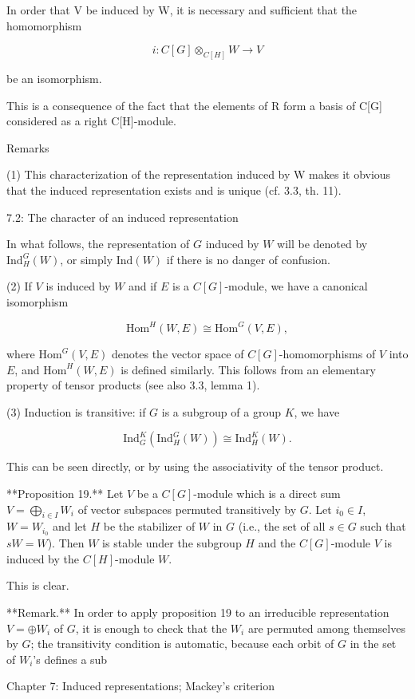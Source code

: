 In order that V be induced by W, it is necessary and sufficient that the homomorphism

$$i: C[G] \otimes_{C[H]} W \rightarrow V$$

be an isomorphism.

This is a consequence of the fact that the elements of R form a basis of C[G] considered as a right C[H]-module.

Remarks

(1) This characterization of the representation induced by W makes it obvious that the induced representation exists and is unique (cf. 3.3, th. 11).

7.2: The character of an induced representation

In what follows, the representation of $G$ induced by $W$ will be denoted by $\text{Ind}_H^G(W)$, or simply $\text{Ind}(W)$ if there is no danger of confusion.

(2) If $V$ is induced by $W$ and if $E$ is a $C[G]$-module, we have a canonical isomorphism

$$\text{Hom}^H(W, E) \cong \text{Hom}^G(V, E),$$

where $\text{Hom}^G(V, E)$ denotes the vector space of $C[G]$-homomorphisms of $V$ into $E$, and $\text{Hom}^H(W, E)$ is defined similarly. This follows from an elementary property of tensor products (see also 3.3, lemma 1).

(3) Induction is transitive: if $G$ is a subgroup of a group $K$, we have

$$\text{Ind}_G^K(\text{Ind}_H^G(W)) \cong \text{Ind}_H^K(W).$$

This can be seen directly, or by using the associativity of the tensor product.

**Proposition 19.** Let $V$ be a $C[G]$-module which is a direct sum $V = \bigoplus_{i \in I} W_i$ of vector subspaces permuted transitively by $G$. Let $i_0 \in I$, $W = W_{i_0}$ and let $H$ be the stabilizer of $W$ in $G$ (i.e., the set of all $s \in G$ such that $sW = W$). Then $W$ is stable under the subgroup $H$ and the $C[G]$-module $V$ is induced by the $C[H]$-module $W$.

This is clear.

**Remark.** In order to apply proposition 19 to an irreducible representation $V = \oplus W_i$ of $G$, it is enough to check that the $W_i$ are permuted among themselves by $G$; the transitivity condition is automatic, because each orbit of $G$ in the set of $W_i$'s defines a sub

Chapter 7: Induced representations; Mackey's criterion
